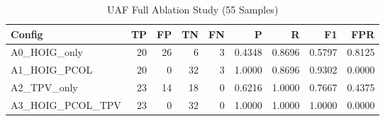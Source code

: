 \begin{table}[htbp]
\centering
\caption{UAF Full Ablation Study (55 Samples)}
\label{tab:uaf_full_ablation}
\begin{tabular}{lrrrrrrrr}
\toprule
Config & TP & FP & TN & FN & P & R & F1 & FPR \\
\midrule
  A0_HOIG_only & 20 & 26 & 6 & 3 & 0.4348 & 0.8696 & 0.5797 & 0.8125 \\
  A1_HOIG_PCOL & 20 & 0 & 32 & 3 & 1.0000 & 0.8696 & 0.9302 & 0.0000 \\
  A2_TPV_only & 23 & 14 & 18 & 0 & 0.6216 & 1.0000 & 0.7667 & 0.4375 \\
  A3_HOIG_PCOL_TPV & 23 & 0 & 32 & 0 & 1.0000 & 1.0000 & 1.0000 & 0.0000 \\
\bottomrule
\end{tabular}
\end{table}

